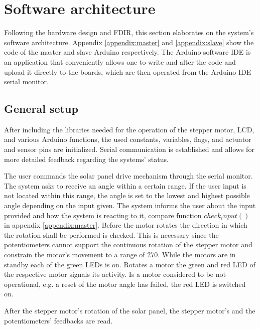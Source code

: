 \section{Software architecture}
Following the hardware design and FDIR, this section elaborates on the system's software architecture. Appendix \ref{appendix:master} and \ref{appendix:slave} show the code of the master and slave Arduino respectively. The Arduino software IDE is an application that conveniently allows one to write and alter the code and upload it directly to the boards, which are then operated from the Arduino IDE serial monitor.

\subsection{General setup}
After including the libraries needed for the operation of the stepper motor, LCD, and various Arduino functions, the used constants, variables, flags, and actuator and sensor pins are initialized. Serial communication is established and allows for more detailed feedback regarding the systems' status. 

The user commands the solar panel drive mechanism through the serial monitor. The system asks to receive an angle within a certain range. If the user input is not located within this range, the angle is set to the lowest and highest possible angle depending on the input given. The system informs the user about the input provided and how the system is reacting to it, compare function \textit{$check_input()$} in appendix \ref{appendix:master}. Before the motor rotates the direction in which the rotation shall be performed is checked. This is necessary since the potentiometers cannot support the continuous rotation of the stepper motor and constrain the motor's movement to a range of 270\degree {}\degree. While the motors are in standby each of the green LEDs is on. Rotates a motor the green and red LED of the respective motor signals its activity. Is a motor considered to be not operational, e.g. a reset of the motor angle has failed, the red LED is switched on. 




After the stepper motor's rotation of the solar panel, the stepper motor's and the potentiometers' feedbacks are read. 



